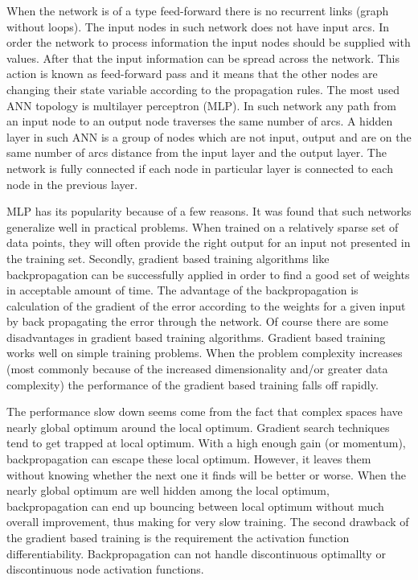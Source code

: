 \documentclass{llncs}
\begin{document}
When the network is of a type feed-forward there is no recurrent links (graph without loops). The input nodes in such network does not have input arcs. In order the network to process information the input nodes should be supplied with values. After that the input information can be spread across the network. This action is known as feed-forward pass and it means that the other nodes are changing their state variable according to the propagation rules. The most used ANN topology is multilayer perceptron (MLP). In such network any path from an input node to an output node traverses the same number of arcs. A hidden layer in such ANN is a group of nodes which are not input, output and are on the same number of arcs distance from the input layer and the output layer. The network is fully connected if each node in particular layer is connected to each node in the previous layer. 

MLP has its popularity because of a few reasons. It was found that such networks generalize well in practical problems. When trained on a relatively sparse set of data points, they will often provide the right output for an input not presented in the training set. Secondly, gradient based training algorithms like backpropagation can be successfully applied in order to find a good set of weights in acceptable amount of time. The advantage of the backpropagation is calculation of the gradient of the error according to the weights for a given input by back propagating the error through the network. Of course there are some disadvantages in gradient based training algorithms. Gradient based training works well on simple training problems. When the problem complexity increases (most commonly because of the increased dimensionality and/or greater data complexity) the performance of the gradient based training falls off rapidly. 

The performance slow down seems come from the fact that complex spaces have nearly global optimum around the local optimum. Gradient search techniques tend to get trapped at local optimum. With a high enough gain (or momentum), backpropagation can escape these local optimum. However, it leaves them without knowing whether the next one it finds will be better or worse. When the nearly global optimum are well hidden among the local optimum, backpropagation can end up bouncing between local optimum without much overall improvement, thus making for very slow training. The second drawback of the gradient based training is the requirement the activation function differentiability. Backpropagation can not handle discontinuous  optimallty or discontinuous node activation functions.
%
\end{document}
